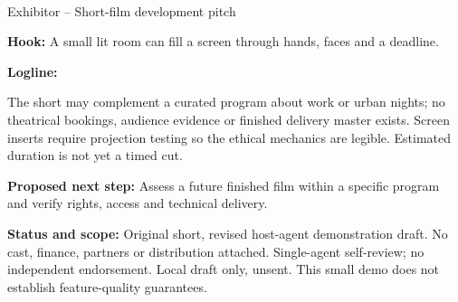 \documentclass[11pt,letterpaper]{article}
\begin{document}
\begin{center}
{\Large\bfseries\sffamily \filmtitleupper}\\[6pt]
Exhibitor -- Short-film development pitch
\end{center}
\textbf{Hook:} A small lit room can fill a screen through hands, faces and a deadline.

\textbf{Logline:} \filmlogline

The short may complement a curated program about work or urban nights; no theatrical bookings, audience evidence or finished delivery master exists. Screen inserts require projection testing so the ethical mechanics are legible. Estimated duration is not yet a timed cut.

\textbf{Proposed next step:} Assess a future finished film within a specific program and verify rights, access and technical delivery.

\textbf{Status and scope:} Original short, revised host-agent demonstration draft. No cast, finance, partners or distribution attached. Single-agent self-review; no independent endorsement. Local draft only, unsent. This small demo does not establish feature-quality guarantees.
\end{document}
